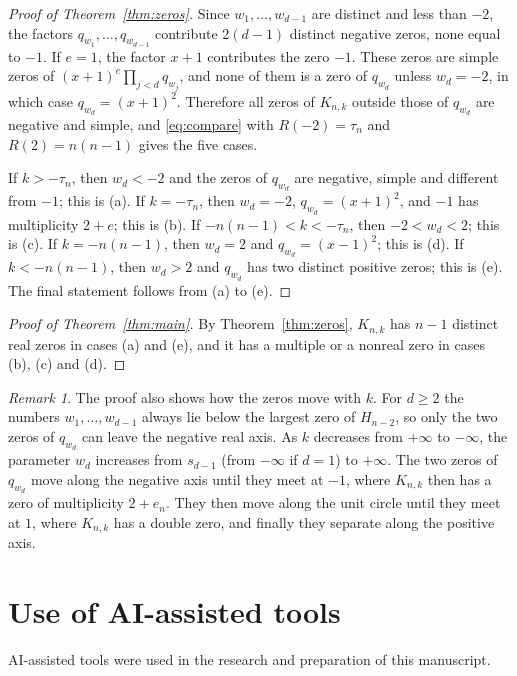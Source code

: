 \documentclass{amsart}
\theoremstyle{remark}
\newtheorem{remark}[theorem]{Remark}
\numberwithin{equation}{section}
\begin{document}
\begin{proof}[Proof of Theorem~\ref{thm:zeros}]
Since $w_1,\dots,w_{d-1}$ are distinct and less than $-2$, the factors
$q_{w_1},\dots,q_{w_{d-1}}$ contribute $2(d-1)$ distinct negative zeros,
none equal to $-1$. If $e=1$, the factor $x+1$ contributes the zero $-1$.
These zeros are simple zeros of $(x+1)^e\prod_{j<d}q_{w_j}$, and none of them
is a zero of $q_{w_d}$ unless $w_d=-2$, in which case $q_{w_d}=(x+1)^2$.
Therefore all zeros of $K_{n,k}$ outside those of $q_{w_d}$ are negative and
simple, and \eqref{eq:compare} with $R(-2)=\tau_n$ and $R(2)=n(n-1)$ gives
the five cases.

If $k>-\tau_n$, then $w_d<-2$ and the zeros of $q_{w_d}$ are negative,
simple and different from $-1$; this is (a). If $k=-\tau_n$, then $w_d=-2$,
$q_{w_d}=(x+1)^2$, and $-1$ has multiplicity $2+e$; this is (b). If
$-n(n-1)<k<-\tau_n$, then $-2<w_d<2$; this is (c). If $k=-n(n-1)$, then
$w_d=2$ and $q_{w_d}=(x-1)^2$; this is (d). If $k<-n(n-1)$, then $w_d>2$ and
$q_{w_d}$ has two distinct positive zeros; this is (e). The final statement
follows from (a) to (e).
\end{proof}

\begin{proof}[Proof of Theorem~\ref{thm:main}]
By Theorem~\ref{thm:zeros}, $K_{n,k}$ has $n-1$ distinct real zeros in cases
(a) and (e), and it has a multiple or a nonreal zero in cases (b), (c) and
(d).
\end{proof}

\begin{remark}
The proof also shows how the zeros move with $k$. For $d\ge 2$ the numbers
$w_1,\dots,w_{d-1}$ always lie below the largest zero of $H_{n-2}$, so only
the two zeros of $q_{w_d}$ can leave the negative real axis. As $k$
decreases from $+\infty$ to $-\infty$, the parameter $w_d$ increases from
$s_{d-1}$ (from $-\infty$ if $d=1$) to $+\infty$. The two zeros of $q_{w_d}$
move along the negative axis until they meet at $-1$, where $K_{n,k}$ then
has a zero of multiplicity $2+e_n$. They then move along the unit circle
until they meet at $1$, where $K_{n,k}$ has a double zero, and finally they
separate along the positive axis.
\end{remark}

\section*{Use of AI-assisted tools}

AI-assisted tools were used in the research and preparation of this manuscript.
\end{document}
